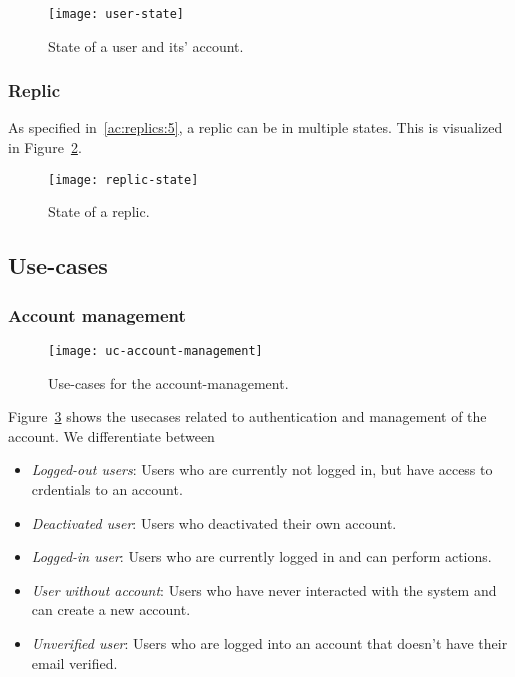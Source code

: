 \begin{figure}
    \centering
    \texttt{[image: user-state]}
    \caption{State of a user and its' account.}
    \label{fig:user-state}
\end{figure}

\subsubsection{Replic}
As specified in~\ref{ac:replics:5}, a replic can be in multiple states.
This is visualized in Figure~\ref{fig:replic-state}.

\begin{figure}
    \centering
    \texttt{[image: replic-state]}
    \caption{State of a replic.}
    \label{fig:replic-state}
\end{figure}

\subsection{Use-cases}\label{subsec:use-cases}

\subsubsection{Account management}
\begin{figure}
    \centering
    \texttt{[image: uc-account-management]}
    \caption{Use-cases for the account-management.}
    \label{fig:account-management}
\end{figure}

Figure~\ref{fig:account-management} shows the usecases related to authentication and management of the account.
We differentiate between
\begin{itemize}
    \item \textit{Logged-out users}: Users who are currently not logged in, but have access to crdentials to an account.
    \item \textit{Deactivated user}: Users who deactivated their own account.
    \item \textit{Logged-in user}: Users who are currently logged in and can perform actions.
    \item \textit{User without account}: Users who have never interacted with the system and can create a new account.
    \item \textit{Unverified user}: Users who are logged into an account that doesn't have their email verified.
\end{itemize}

